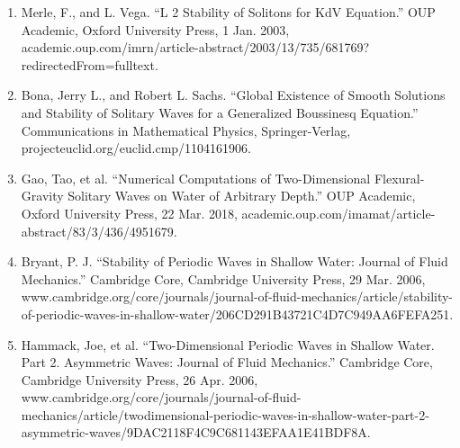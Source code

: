 \documentclass{article}
\begin{document}
\begin{enumerate}
\item Merle, F., and L. Vega. “L 2 Stability of Solitons for KdV Equation.” OUP Academic, Oxford University Press, 1 Jan. 2003, academic.oup.com/imrn/article-abstract/2003/13/735/681769?redirectedFrom=fulltext. \\

\item Bona, Jerry L., and Robert L. Sachs. “Global Existence of Smooth Solutions and Stability of Solitary Waves for a Generalized Boussinesq Equation.” Communications in Mathematical Physics, Springer-Verlag, projecteuclid.org/euclid.cmp/1104161906. \\


\item Gao, Tao, et al. “Numerical Computations of Two-Dimensional Flexural-Gravity Solitary Waves on Water of Arbitrary Depth.” OUP Academic, Oxford University Press, 22 Mar. 2018, academic.oup.com/imamat/article-abstract/83/3/436/4951679. \\

\item Bryant, P. J. “Stability of Periodic Waves in Shallow Water: Journal of Fluid Mechanics.” Cambridge Core, Cambridge University Press, 29 Mar. 2006, www.cambridge.org/core/journals/journal-of-fluid-mechanics/article/stability-of-periodic-waves-in-shallow-water/206CD291B43721C4D7C949AA6FEFA251. \\

\item Hammack, Joe, et al. “Two-Dimensional Periodic Waves in Shallow Water. Part 2. Asymmetric Waves: Journal of Fluid Mechanics.” Cambridge Core, Cambridge University Press, 26 Apr. 2006, www.cambridge.org/core/journals/journal-of-fluid-mechanics/article/twodimensional-periodic-waves-in-shallow-water-part-2-asymmetric-waves/9DAC2118F4C9C681143EFAA1E41BDF8A. \\

\end{enumerate}
\end{document}

